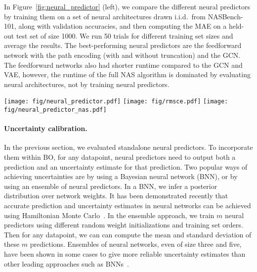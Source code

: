 \documentclass[11pt]{article}
\numberwithin{equation}{section}
\numberwithin{figure}{section}
\theoremstyle{plain}
\theoremstyle{definition}
\begin{document}
In Figure~\ref{fig:neural_predictor} (left), we compare the different neural
predictors by training them on a set of neural architectures drawn i.i.d.\ from
NASBench-101, along with validation accuracies, and then computing the 
MAE on a held-out test set of size 1000. 
We run 50 trials for different training set sizes
and average the results.
The best-performing neural predictors are the feedforward network with the path encoding
(with and without truncation) and the GCN.
The feedforward networks also had shorter runtime compared to the GCN and VAE,
however, the runtime of the full NAS algorithm is dominated by evaluating neural architectures,
not by training neural predictors.


\begin{figure*}[ht]
\centering
\texttt{[image: fig/neural\_predictor.pdf]}
\texttt{[image: fig/rmsce.pdf]}
\texttt{[image: fig/neural\_predictor\_nas.pdf]}
\caption{Performance of neural predictors on NASBench-101:
predictive ability (left), accuracy of uncertainty estimates (middle),
performance in NAS when combined with BO (right). 
}
\label{fig:neural_predictor}
\end{figure*}




\paragraph{Uncertainty calibration.}
In the previous section, we evaluated standalone neural predictors. 
To incorporate them within BO, for any datapoint, neural predictors need to output 
both a prediction and an uncertainty estimate for that prediction.
Two popular ways of achieving uncertainties are by using a Bayesian neural
network (BNN), or by using an ensemble of neural predictors.
In a BNN, we infer a posterior distribution over network weights.
It has been demonstrated recently that accurate prediction and uncertainty 
estimates in neural networks can be achieved using Hamiltonian 
Monte Carlo~\cite{springenberg2016bayesian}.
In the ensemble approach, we train $m$ neural predictors 
using different random weight initializations and training set orders.
Then for any datapoint, we can can compute the mean and standard
deviation of these $m$ predictions.
Ensembles of neural networks, even of size three and five,
have been shown in some cases to give more reliable uncertainty 
estimates than other leading approaches such as BNNs~\cite{lakshminarayanan2017simple, beluch2018power, choi2016ensemble, snoek2019can, zaidi2020neural}.
\end{document}
